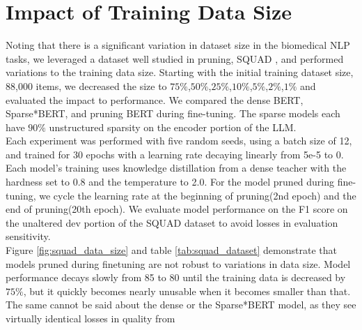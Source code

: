 \section{Impact of Training Data Size}
Noting that there is a significant variation in dataset size in the biomedical NLP tasks, we leveraged a dataset well studied in pruning, SQUAD \cite{Rajpurkar2016SQuAD1Q}, and performed variations to the training data size. Starting with the initial training dataset size, 88,000 items, we decreased the size to $75\%$,$50\%$,$25\%$,$10\%$,$5\%$,$2\%$,$1\%$ and evaluated the impact to performance. We compared the dense BERT, Sparse*BERT, and pruning BERT during fine-tuning. The sparse models each have $90\%$ unstructured sparsity on the encoder portion of the LLM. \\ 
Each experiment was performed with five random seeds, using a batch size of 12, and trained for 30 epochs with a learning rate decaying linearly from 5e-5 to 0. Each model's training uses knowledge distillation from a dense teacher with the hardness set to 0.8 and the temperature to 2.0. For the model pruned during fine-tuning, we cycle the learning rate at the beginning of pruning(2nd epoch) and the end of pruning(20th epoch). We evaluate model performance on the F1 score on the unaltered dev portion of the SQUAD dataset to avoid losses in evaluation sensitivity.\\
Figure \ref{fig:squad_data_size} and table \ref{tab:squad_dataset} demonstrate that models pruned during finetuning are not robust to variations in data size. Model performance decays slowly from 85 to 80 until the training data is decreased by $75\%$, but it quickly becomes nearly unusable when it becomes smaller than that. The same cannot be said about the dense or the Sparse*BERT model, as they see virtually identical losses in quality from 
